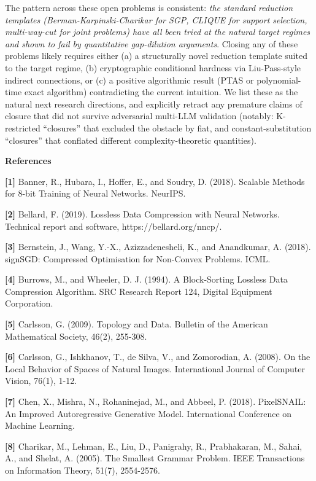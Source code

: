 \documentclass[
]{article}
\begin{document}
The pattern across these open problems is consistent: \emph{the
standard reduction templates (Berman-Karpinski-Charikar for SGP,
CLIQUE for support selection, multi-way-cut for joint problems)
have all been tried at the natural target regimes and shown to
fail by quantitative gap-dilution arguments}. Closing any of these
problems likely requires either (a) a structurally novel reduction
template suited to the target regime, (b) cryptographic conditional
hardness via Liu-Pass-style indirect connections, or (c) a positive
algorithmic result (PTAS or polynomial-time exact algorithm)
contradicting the current intuition. We list these as the natural
next research directions, and explicitly retract any premature
claims of closure that did not survive adversarial multi-LLM
validation (notably: K-restricted ``closures'' that excluded the
obstacle by fiat, and constant-substitution ``closures'' that
conflated different complexity-theoretic quantities).

\textbf{References}

\textbf{{[}1{]}} Banner, R., Hubara, I., Hoffer, E., and Soudry, D.
(2018). Scalable Methods for 8-bit Training of Neural Networks. NeurIPS.

\textbf{{[}2{]}} Bellard, F. (2019). Lossless Data Compression with
Neural Networks. Technical report and software,
https://bellard.org/nncp/.

\textbf{{[}3{]}} Bernstein, J., Wang, Y.-X., Azizzadenesheli, K., and
Anandkumar, A. (2018). signSGD: Compressed Optimisation for Non-Convex
Problems. ICML.

\textbf{{[}4{]}} Burrows, M., and Wheeler, D. J. (1994). A Block-Sorting
Lossless Data Compression Algorithm. SRC Research Report 124, Digital
Equipment Corporation.

\textbf{{[}5{]}} Carlsson, G. (2009). Topology and Data. Bulletin of the
American Mathematical Society, 46(2), 255-308.

\textbf{{[}6{]}} Carlsson, G., Ishkhanov, T., de Silva, V., and
Zomorodian, A. (2008). On the Local Behavior of Spaces of Natural
Images. International Journal of Computer Vision, 76(1), 1-12.

\textbf{{[}7{]}} Chen, X., Mishra, N., Rohaninejad, M., and Abbeel, P.
(2018). PixelSNAIL: An Improved Autoregressive Generative Model.
International Conference on Machine Learning.

\textbf{{[}8{]}} Charikar, M., Lehman, E., Liu, D., Panigrahy, R.,
Prabhakaran, M., Sahai, A., and Shelat, A. (2005). The Smallest Grammar
Problem. IEEE Transactions on Information Theory, 51(7), 2554-2576.
\end{document}
